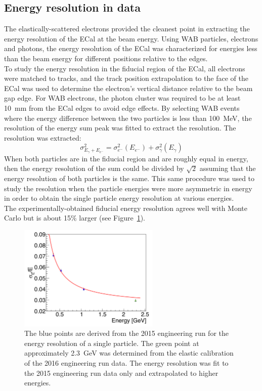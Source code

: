 \subsection{Energy resolution in data}\label{EcalResData}
The elastically-scattered electrons provided the cleanest point in extracting the energy resolution of the ECal at the beam energy. Using WAB particles, electrons and photons, the energy resolution of the ECal was characterized for energies less than the beam energy for different positions relative to the edges.\\
\indent To study the energy resolution in the fiducial region of the ECal, all electrons were matched to tracks, and the track position extrapolation to the face of the ECal was used to determine the electron's vertical distance relative to the beam gap edge. For WAB electrons, the photon cluster was required to be at least 10~mm from the ECal edges to avoid edge effects. By selecting WAB events where the energy difference between the two particles is less than 100~MeV, the resolution of the energy sum peak was fitted to extract the resolution. The resolution was extracted:
\begin{equation}
	\label{eq:eResExtract}
	\sigma_{E_{\gamma}+E_{e^-}}^2 = \sigma_{e^-}^2(E_{e^-})+\sigma_{\gamma}^2(E_{\gamma})
\end{equation}
When both particles are in the fiducial region and are roughly equal in energy, then the energy resolution of the sum could be divided by $\sqrt{2}$ assuming that the energy resolution of both particles is the same. This same procedure was used to study the resolution when the particle energies were more asymmetric in energy in order to obtain the single particle energy resolution at various energies. \\
\indent The experimentally-obtained fiducial energy resolution agrees well with Monte Carlo but is about 15$\%$ larger (see Figure~\ref{Figure:eResData}).
\begin{figure}[htb]
  \centering
      \includegraphics[width=0.6\textwidth]{pics/performance/eResData.png}
  \caption[Energy resolution of the ECal found in data]{The blue points are derived from the 2015 engineering run for the energy resolution of a single particle. The green point at approximately 2.3~GeV was determined from the elastic calibration of the 2016 engineering run data. The energy resolution was fit to the 2015 engineering run data only and extrapolated to higher energies.}
  \label{Figure:eResData}
\end{figure}

